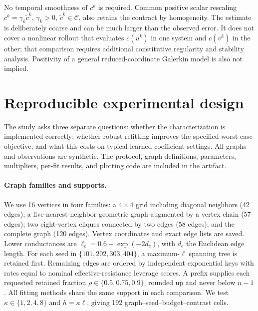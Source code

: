 \documentclass[11pt]{article}
\begin{document}
No temporal smoothness of $c^k$ is required. Common positive scalar rescaling $c^k=\gamma_k\widetilde c^k$, $\gamma_k>0$, $\widetilde c^k\in\mathcal C$, also retains the contract by homogeneity. The estimate is deliberately coarse and can be much larger than the observed error. It does not cover a nonlinear rollout that evaluates $c(u^k)$ in one system and $c(v^k)$ in the other; that comparison requires additional constitutive regularity and stability analysis. Positivity of a general reduced-coordinate Galerkin model is also not implied.

\section{Reproducible experimental design}
The study asks three separate questions: whether the characterization is implemented correctly; whether robust refitting improves the specified worst-case objective; and what this costs on typical learned coefficient settings. All graphs and observations are synthetic. The protocol, graph definitions, parameters, multipliers, per-fit results, and plotting code are included in the artifact.

\paragraph{Graph families and supports.}
We use 16 vertices in four families: a $4\times4$ grid including diagonal neighbors (42 edges); a five-nearest-neighbor geometric graph augmented by a vertex chain (57 edges); two eight-vertex cliques connected by two edges (58 edges); and the complete graph (120 edges). Vertex coordinates and exact edge lists are saved. Lower conductances are $\ell_e=0.6+\exp(-2d_e)$, with $d_e$ the Euclidean edge length. For each seed in $\{101,202,303,404\}$, a maximum-$\ell$ spanning tree is retained first. Remaining edges are ordered by independent exponential keys with rates equal to nominal effective-resistance leverage scores. A prefix supplies each requested retained fraction $\rho\in\{0.5,0.75,0.9\}$, rounded up and never below $n-1$. All fitting methods share the same support in each comparison. We test $\kappa\in\{1,2,4,8\}$ and $h=\kappa\ell$, giving 192 graph--seed--budget--contrast cells.
\end{document}
